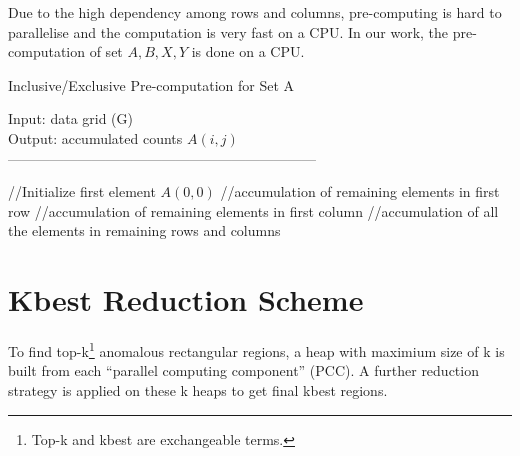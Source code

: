 \documentclass[AMA,LATO1COL]{WileyNJD-v2-bak}
\begin{document}
Due to the high dependency among rows and columns, pre-computing is hard to parallelise and the computation is very fast on a CPU. In our work, the pre-computation of set $A, B, X, Y$ is done on a CPU.

\begin{algorithm}[t!]
\caption{Inclusive/Exclusive Pre-computation for Set A}\label{preinex}
Input: data grid (G) \\
Output: accumulated counts $A(i,j)$\\
------------------------------------------------------------------ \\
\begin{algorithmic}[1]
\State //Initialize first element $A(0,0)$
\State //accumulation of remaining elements in first row
\EndFor
\State //accumulation of remaining elements in first column
\EndFor
\State //accumulation of all the elements in remaining rows and columns
\EndFor
{}
\EndFor
\EndFor
\end{algorithmic}
\end{algorithm}
\section{ Kbest Reduction Scheme}\label{KBEST}
To find top-k\footnote{Top-k and kbest are exchangeable terms.} anomalous rectangular regions, a heap with maximium size of k is built from each ``parallel computing component'' (PCC). A further reduction strategy is applied on these k heaps to get final kbest regions.
\end{document}
